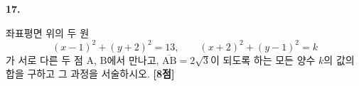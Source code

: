 \documentclass[10pt]{article}
\renewenvironment{problem}[2]{%
  \par%
  \setcounter{probnum}{#1}%
  \noindent
  \begin{minipage}[t]{\linewidth}%
  \setlength{\parskip}{4pt plus 1pt}%
  {\sffamily\bfseries\large\color{black}#1.}\par\smallskip\ignorespaces
}{%
  \end{minipage}\par%
}
\newcommand{\pts}[1]{\nobreak\hspace*{\fill}\textbf{[#1점]}\par}
\begin{document}
\begin{pagepair}
\noindent
\begin{minipage}[t]{0.46\linewidth}\raggedright
\begin{problem}{17}{s}
좌표평면 위의 두 원
$$(x-1)^{2}+(y+2)^{2}=13,\qquad (x+2)^{2}+(y-1)^{2}=k$$
가 서로 다른 두 점 $\mathrm{A}$, $\mathrm{B}$에서 만나고, $\overline{\mathrm{AB}}=2\sqrt{3}$이 되도록 하는 모든 양수 $k$의 값의 합을 구하고 그 과정을 서술하시오. \pts{8}
\end{problem}
\end{minipage}\hfill\begin{minipage}[t]{0.46\linewidth}\mbox{}\end{minipage}
\end{pagepair}
\end{document}
